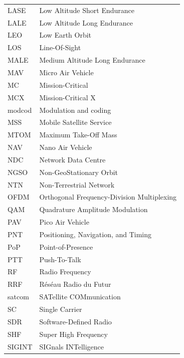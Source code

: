 \documentclass[english, 12pt, a4paper, elec, utf8, a-1b, online]{aaltothesis}
\begin{document}
\begin{tabular}{ll}
LASE                    & Low Altitude Short Endurance \\
LALE                    & Low Altitude Long Endurance \\
LEO                     & Low Earth Orbit \\
LOS                     & Line-Of-Sight \\
MALE                    & Medium Altitude Long Endurance \\
MAV                     & Micro Air Vehicle \\
MC                      & Mission-Critical \\
MCX                     & Mission-Critical X \\
modcod                  & Modulation and coding \\
MSS                     & Mobile Satellite Service \\
MTOM                    & Maximum Take-Off Mass \\
NAV                     & Nano Air Vehicle \\
NDC                     & Network Data Centre \\
NGSO                    & Non-GeoStationary Orbit \\
NTN                     & Non-Terrestrial Network \\
OFDM                    & Orthogonal Frequency-Division Multiplexing \\
QAM                     & Quadrature Amplitude Modulation \\
PAV                     & Pico Air Vehicle \\
PNT                     & Positioning, Navigation, and Timing \\
PoP                     & Point-of-Presence \\
PTT                     & Push-To-Talk \\
RF                      & Radio Frequency \\
RRF                     & Réséau Radio du Futur \\
satcom                  & SATellite COMmunication \\
SC                      & Single Carrier \\
SDR                     & Software-Defined Radio \\
SHF                     & Super High Frequency \\
SIGINT                  & SIGnals INTelligence \\

\end{tabular}
\end{document}
